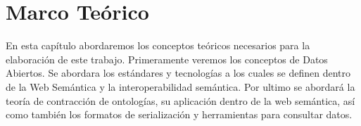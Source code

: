 \chapter{Marco Teórico}
\label{chap:Marco Teorico}

En esta capítulo abordaremos los conceptos teóricos necesarios para la elaboración de este trabajo. Primeramente veremos los conceptos de Datos Abiertos. Se abordara los estándares y tecnologías a los cuales se definen dentro de la Web Semántica y la interoperabilidad semántica. Por ultimo se abordará la teoría de contracción de ontologías, su aplicación dentro de la web semántica, así como también los formatos de serialización y herramientas para consultar datos.






